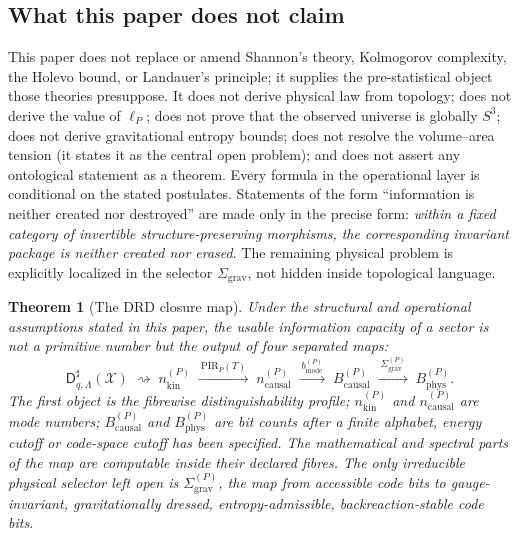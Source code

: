 \documentclass[11pt,a4paper]{article}
\newtheorem{theorem}{Theorem}[section]
\theoremstyle{definition}
\theoremstyle{remark}
\newcommand{\Sthree}{S^{3}}
\newcommand{\lP}{\ell_{P}}
\newcommand{\Dsharp}{\mathsf{D}^{\sharp}}
\newcommand{\PIR}{\mathrm{PIR}}
\newcommand{\nkin}{n_{\mathrm{kin}}}
\newcommand{\ncausal}{n_{\mathrm{causal}}}
\newcommand{\Bphys}{B_{\mathrm{phys}}}
\newcommand{\Bcausal}{B_{\mathrm{causal}}}
\newcommand{\Bmode}{b_{\mathrm{mode}}}
\begin{document}
\subsection{What this paper does not claim}

\begin{tcolorbox}[colback=gray!4,colframe=gray!50,title=Boundary of the paper]
This paper does not replace or amend Shannon's theory, Kolmogorov complexity, the Holevo bound,
or Landauer's principle; it supplies the pre-statistical object those theories presuppose.  It
does not derive physical law from topology; does not derive the value of $\lP$; does not prove
that the observed universe is globally $\Sthree$; does not derive gravitational entropy bounds;
does not resolve the volume--area tension (it states it as the central open problem); and does
not assert any ontological statement as a theorem.  Every formula in the operational layer is
conditional on the stated postulates.  Statements of the form ``information is neither created
nor destroyed'' are made only in the precise form: \emph{within a fixed category of invertible
structure-preserving morphisms, the corresponding invariant package is neither created nor
erased}.  The remaining physical problem is explicitly localized in the selector
$\Sigma_{\mathrm{grav}}$, not hidden inside topological language.
\end{tcolorbox}

\begin{theorem}[The DRD closure map]
\label{thm:main-pipeline}
Under the structural and operational assumptions stated in this paper, the usable information
capacity of a sector is not a primitive number but the output of four separated maps:
\[
\Dsharp_{q,\Lambda}(\mathcal X)
\;\rightsquigarrow\;
\nkin^{(P)}
\;\xrightarrow{\ \PIR_P(T)\ }\;
\ncausal^{(P)}
\;\xrightarrow{\ \Bmode^{(P)}\ }\;
\Bcausal^{(P)}
\;\xrightarrow{\ \Sigma_{\mathrm{grav}}^{(P)}\ }\;
\Bphys^{(P)}.
\]
The first object is the fibrewise distinguishability profile; $\nkin^{(P)}$ and
$\ncausal^{(P)}$ are mode numbers; $\Bcausal^{(P)}$ and $\Bphys^{(P)}$ are bit counts after a
finite alphabet, energy cutoff or code-space cutoff has been specified.  The mathematical and
spectral parts of the map are computable inside their declared fibres.  The only irreducible
physical selector left open is $\Sigma_{\mathrm{grav}}^{(P)}$, the map from accessible code bits
to gauge-invariant, gravitationally dressed, entropy-admissible, backreaction-stable code bits.
\end{theorem}
\end{document}

